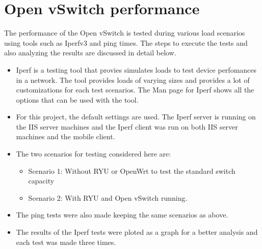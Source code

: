 \section{Open vSwitch performance}
The performance of the Open vSwitch is tested during various load scenarios using tools such as Iperfv3 and ping times. The steps to execute the tests and also analyzing the results are discussed in detail below.
\begin{itemize}
	\item Iperf is a testing tool that provies simulates loads to test device perfomances in a network. The tool provides loads of varying sizes and provides a lot of customizations for each test scenarios. The Man page for Iperf shows all the options that can be used with the tool.
	\item For this project, the default settings are used. The Iperf server is running on the IIS server machines and the Iperf client was run on both IIS server machines and the mobile client.
	\item The two scenarios for testing considered here are:
	\begin{itemize}
		\item Scenario 1: Without RYU or OpenWrt to test the standard switch capacity
		\item Scenario 2: With RYU and Open vSwitch running.
	\end{itemize}
	\item The ping tests were also made keeping the same scenarios as above.
	\item The results of the Iperf tests were ploted as a graph for a better analysis and each test was made three times.
	
\end{itemize}
